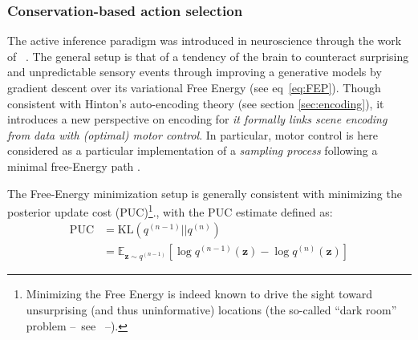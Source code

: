 \documentclass[12pt,twoside,openright]{article}
\begin{document}
\subsubsection{Conservation-based action selection}

The active inference paradigm was introduced in neuroscience through the work of ~\cite{friston2010free,friston2012perceptions}. %
The general setup is that of a tendency of the brain to counteract surprising and unpredictable sensory events through 
improving a generative models by gradient descent over its variational Free Energy (see eq~\ref{eq:FEP}). 
Though consistent with Hinton's auto-encoding theory (see section \ref{sec:encoding}), it introduces a new perspective on encoding
for \emph{it formally links scene encoding from data with (optimal) motor control}.
In particular, motor control is here considered as a particular implementation of a \emph{sampling process}
following a minimal free-Energy path \cite{friston2012perceptions}. %

The Free-Energy minimization setup is generally consistent with minimizing the posterior update cost (PUC)\footnote{Minimizing the Free Energy is indeed known to drive the sight toward unsurprising (and thus uninformative) locations (the so-called ``dark room'' problem --~see \cite{friston2012perceptions}~--).}., with the PUC estimate defined as:
\begin{align*}
\text{PUC} &= \text{KL}(q^{(n-1)}||q^{(n)})\\
&= \mathbb{E}_{\boldsymbol{z} \sim q^{(n-1)}} \left[\log q^{(n-1)}(\boldsymbol{z}) - \log q^{(n)}(\boldsymbol{z})\right]
\end{align*}
  
\end{document}
